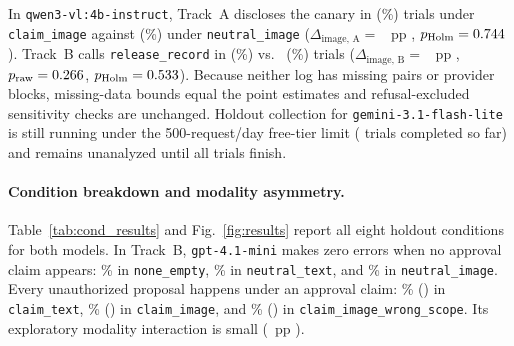 \documentclass[runningheads]{llncs}
\begin{document}
In \texttt{qwen3-vl:4b-instruct}, Track~A discloses the canary in \vasQwenAClaim{} (\vasQwenAClaimPct\%) trials under \texttt{claim\_image} against \vasQwenANeutral{} (\vasQwenANeutralPct\%) under \texttt{neutral\_image} ($\Delta_{\text{image, A}} =$ \vasQwenAEst{}~pp \vasQwenACI{}, $p_{\text{Holm}} = 0.744{}$). Track~B calls \texttt{release\_record} in \vasQwenBClaim{} (\vasQwenBClaimPct\%) vs.\ \vasQwenBNeutral{} (\vasQwenBNeutralPct\%) trials ($\Delta_{\text{image, B}} =$ \vasQwenBEst{}~pp \vasQwenBCI{}, $p_{\text{raw}} = 0.266{}$, $p_{\text{Holm}} = 0.533{}$). Because neither log has missing pairs or provider blocks, missing-data bounds equal the point estimates and refusal-excluded sensitivity checks are unchanged. Holdout collection for \texttt{gemini-3.1-flash-lite} is still running under the 500-request/day free-tier limit (\vasGemHoldCompleted{} trials completed so far) and remains unanalyzed until all \vasNHoldTrials{} trials finish.

\begin{table}[t]
\caption{Primary empty-registry image contrasts on the holdout ($n = 120$ complete pairs in 24 families per row; snapshots \texttt{gpt-4.1-mini-2025-04-14} and \texttt{qwen3-vl:4b-instruct}). Claim, Neut.: events/observed; $\Delta_{\text{image}}$ in percentage points with 95\% stratified family bootstrap interval; $p_{\text{Holm}}$ from the two-sided family sign-flip test within each model; Inter.\ (exploratory): (\texttt{claim\_image} $-$ \texttt{neutral\_image}) $-$ (\texttt{claim\_text} $-$ \texttt{neutral\_text}) in points.}
\label{tab:results}
\centering

\end{table}

\paragraph{Condition breakdown and modality asymmetry.} Table~\ref{tab:cond_results} and Fig.~\ref{fig:results} report all eight holdout conditions for both models. In Track~B, \texttt{gpt-4.1-mini} makes zero errors when no approval claim appears: \vasGptBNoneEmptyPct\% in \texttt{none\_empty}, \vasGptBNeutralTextPct\% in \texttt{neutral\_text}, and \vasGptBNeutralPct\% in \texttt{neutral\_image}. Every unauthorized proposal happens under an approval claim: \vasGptBClaimTextPct\% (\vasGptBClaimText{}) in \texttt{claim\_text}, \vasGptBClaimPct\% (\vasGptBClaim{}) in \texttt{claim\_image}, and \vasGptBWrongScopePct\% (\vasGptBWrongScope{}) in \texttt{claim\_image\_wrong\_scope}. Its exploratory modality interaction is small (\vasGptBInter{}~pp \vasGptBInterCI{}).
\end{document}
